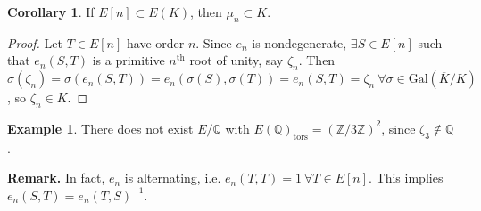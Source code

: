 \documentclass{article}
\theoremstyle{definition}
\newtheorem{cor}[theorem]{Corollary}
\newtheorem{example}{Example}[section]
\begin{document}
\begin{cor}\label{cor14.6}
    If $E[n] \subset E(K)$, then $\mu_n \subset K$.
\end{cor}
\begin{proof}
    Let $T \in E[n]$ have order $n$. Since $e_n$ is nondegenerate, $\exists S \in E[n]$ such that $e_n(S,T)$ is a primitive $n^{\text{th}}$ root of unity, say $\zeta_n$. Then $\sigma(\zeta_n)=\sigma(e_n(S,T))=e_n(\sigma(S),\sigma(T))=e_n(S,T)=\zeta_n ~\forall \sigma \in \text{Gal}(\overline{K}/K)$, so $\zeta_n \in K$.
\end{proof}
\begin{example}
    There does not exist $E/\mathbb{Q}$ with $E(\mathbb{Q})_{\text{tors}} = (\mathbb{Z}/3\mathbb{Z})^2$, since $\zeta_3 \not\in \mathbb{Q}$.
\end{example}
\textbf{Remark.} In fact, $e_n$ is alternating, i.e. $e_n(T,T)=1 ~\forall T \in E[n]$. This implies $e_n(S,T)=e_n(T,S)^{-1}$.
\end{document}
